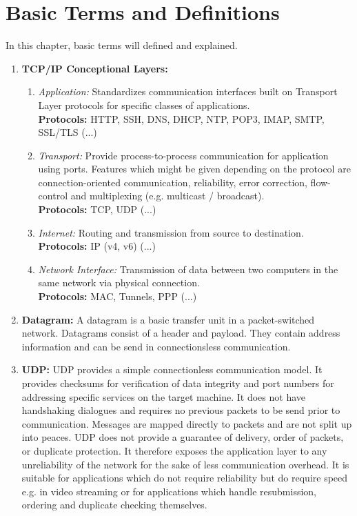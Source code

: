 \section{Basic Terms and Definitions}

In this chapter, basic terms will defined and explained.

\begin{enumerate}
      \item \textbf{\acs{TCP}/\acs{IP} Conceptional Layers:}
            \begin{enumerate}
                  \item \textit{Application:} Standardizes communication interfaces built on Transport Layer protocols for specific classes of applications.\\
                        \textbf{Protocols:} \ac{HTTP}, \ac{SSH}, \ac{DNS}, \ac{DHCP}, \ac{NTP}, \ac{POP3}, \ac{IMAP}, \ac{SMTP}, \ac{SSL}/\ac{TLS} (...)
                  \item \textit{Transport:} Provide process-to-process communication for application using ports. Features which might be given depending on the protocol are connection-oriented communication, reliability, error correction, flow-control and multiplexing (e.g. multicast / broadcast).\\
                        \textbf{Protocols:} \ac{TCP}, \ac{UDP} (...)
                  \item \textit{Internet:} Routing and transmission from source to destination.\\
                        \textbf{Protocols:} \ac{IP} (v4, v6) (...)
                  \item \textit{Network Interface:} Transmission of data between two computers in the same network via physical connection.\\
                        \textbf{Protocols:} \ac{MAC}, Tunnels, \ac{PPP} (...)
            \end{enumerate}
      \item \textbf{Datagram:} A datagram is a basic transfer unit in a packet-switched network. Datagrams consist of a header and payload. They contain address information and can be send in connectionsless communication.
      \item \textbf{\acf{UDP}:} \ac{UDP} provides a simple connectionless communication model. It provides checksums for verification of data integrity and port numbers for addressing specific services on the target machine. It does not have handshaking dialogues and requires no previous packets to be send prior to communication. Messages are mapped directly to packets and are not split up into peaces. \ac{UDP} does not provide a guarantee of delivery, order of packets, or duplicate protection. It therefore exposes the application layer to any unreliability of the network for the sake of less communication overhead. It is suitable for applications which do not require reliability but do require speed e.g. in video streaming or for applications which handle resubmission, ordering and duplicate checking themselves.

\end{enumerate}
